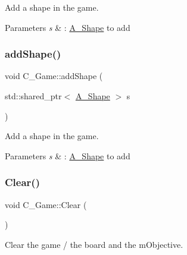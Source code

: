 Add a shape in the game. 


\begin{DoxyParams}{Parameters}
{\em s} & \+: \hyperlink{classA__Shape}{A\+\_\+\+Shape} to add \\
\hline
\end{DoxyParams}
\mbox{\label{classC__Game_ad2b7512192879ec7cd76d4eed4fef938}} 
\subsubsection{\texorpdfstring{add\+Shape()}{addShape()}\hspace{0.1cm}{\footnotesize\ttfamily [2/2]}}
{\footnotesize\ttfamily void C\+\_\+\+Game\+::add\+Shape (\begin{DoxyParamCaption}\item[{std\+::shared\+\_\+ptr$<$ \hyperlink{classA__Shape}{A\+\_\+\+Shape} $>$}]{s }\end{DoxyParamCaption})}



Add a shape in the game. 


\begin{DoxyParams}{Parameters}
{\em s} & \+: \hyperlink{classA__Shape}{A\+\_\+\+Shape} to add \\
\hline
\end{DoxyParams}
\mbox{\label{classC__Game_a1ad2e168bba0305e48c0bf8e162a889a}} 
\subsubsection{\texorpdfstring{Clear()}{Clear()}\hspace{0.1cm}{\footnotesize\ttfamily [1/2]}}
{\footnotesize\ttfamily void C\+\_\+\+Game\+::\+Clear (\begin{DoxyParamCaption}{ }\end{DoxyParamCaption})}



Clear the game / the board and the m\+Objective. 

\mbox{\label{classC__Game_a1ad2e168bba0305e48c0bf8e162a889a}} 
